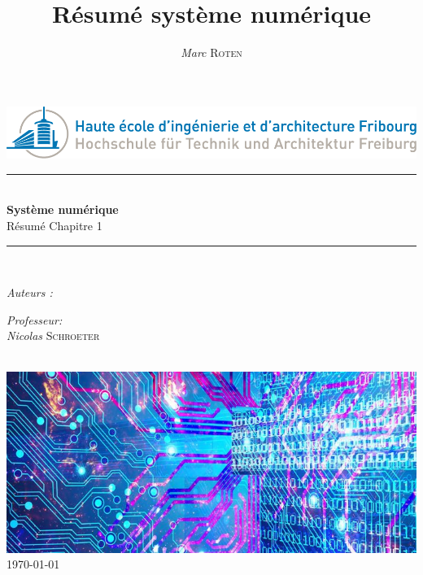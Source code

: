 

\title{Résumé système numérique} 
\author{\textsl{Marc} \textsc{Roten}}
\date{}


    \begin{titlepage}
        \begin{center}
            \includegraphics[scale=.4]{Img/heia-fr-logo.png}\\[1.3cm]
            
            \rule{\linewidth}{0.3mm} \\[0.3cm]
            {\huge \bfseries Système numérique\\[0.5cm]} 
            {\Large  Résumé Chapitre 1 }
            \rule{\linewidth}{0.3mm} \\[0.8cm]
            \noindent
            \begin{minipage}[t]{0.4\textwidth}
                \begin{flushleft} \large
                    \emph{Auteurs :}\\
                    \theauthor
                \end{flushleft}
            \end{minipage}
            \begin{minipage}[t]{0.4\textwidth} 
                \begin{flushright} \large
                    \emph{Professeur:}\\
                    \textsl{Nicolas} \textsc{ Schroeter}\\ 
                \end{flushright} 
                \vfill
            \end{minipage}\\[1.3cm]
            \includegraphics[scale=0.7]{Img/title.jpg}\\[1.5cm]
            \vspace*{1\baselineskip}
            \today \\[0.7cm]
        \end{center}
    \end{titlepage}
    \tableofcontents
    \clearpage

